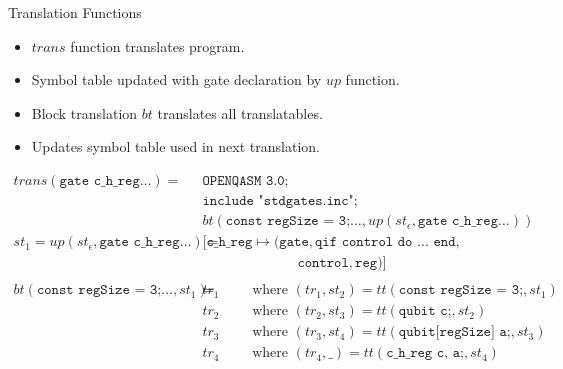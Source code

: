 \begin{frame}{Translation Functions}
    \begin{itemize}
        \item $trans$ function translates program.
        \item Symbol table updated with gate declaration by $up$ function.
        \item Block translation $bt$ translates all translatables.
        \item Updates symbol table used in next translation.
    \end{itemize}
    \Large
    \begin{align*}
        trans(\texttt{gate c\_h\_reg} \dots) =& \ \texttt{OPENQASM 3.0;}\\
                                              & \ \texttt{include "stdgates.inc";}\\
                                              & \ bt(\texttt{const regSize = 3;} \dots, up(st_\epsilon, \texttt{gate c\_h\_reg} \dots))\\
        st_1 = up(st_\epsilon, \texttt{gate c\_h\_reg} \dots) =& \ 
        [ \texttt{c\_h\_reg} \mapsto (\texttt{gate}, \texttt{qif control do ... end}, \\
        & \quad\quad\quad\quad\quad\quad\quad \texttt{control}, \texttt{reg})  ]\\
        &\\
        bt(\texttt{const regSize = 3;} \dots, st_1) =& \ tr_1 \quad \quad \text{ where } (tr_1, st_2) = tt(\texttt{const regSize = 3;}, st_1)\\ 
                                                & \ tr_2 \quad \quad \text{ where } (tr_2, st_3) = tt(\texttt{qubit c;}, st_2)\\ 
                                                & \ tr_3 \quad \quad \text{ where } (tr_3, st_4) = tt(\texttt{qubit[regSize] a;}, st_3)\\ 
                                                & \ tr_4 \quad \quad \text{ where } (tr_4, \_) = tt(\texttt{c\_h\_reg c, a;}, st_4)
    \end{align*}
\end{frame}

